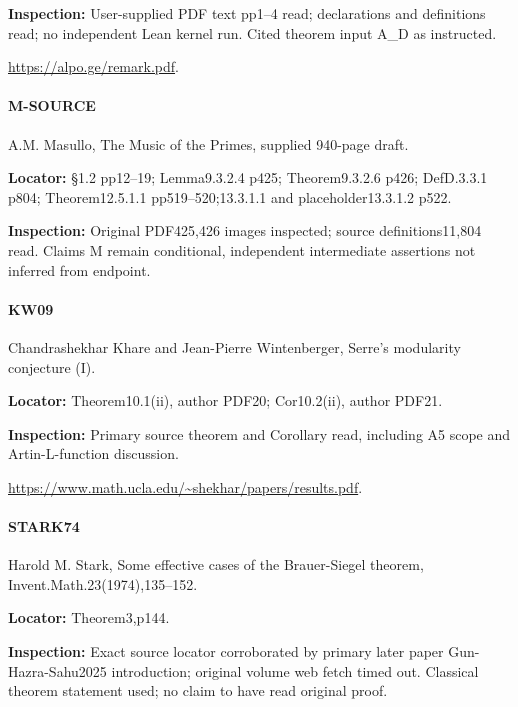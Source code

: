 \documentclass[11pt,a4paper]{article}
\begin{document}
\textbf{Inspection:} User-supplied PDF text pp1–\allowbreak{}4 read; declarations and definitions read; no independent Lean kernel run.\allowbreak{} Cited theorem input A\_\allowbreak{}D as instructed.\allowbreak{}

\url{https://alpo.ge/remark.pdf}.

\paragraph{M-SOURCE} A.\allowbreak{}M.\allowbreak{} Masullo, The Music of the Primes, supplied 940-page draft.

\textbf{Locator:} §1.\allowbreak{}2 pp12–\allowbreak{}19; Lemma9.\allowbreak{}3.\allowbreak{}2.\allowbreak{}4 p425; Theorem9.\allowbreak{}3.\allowbreak{}2.\allowbreak{}6 p426; DefD.\allowbreak{}3.\allowbreak{}3.\allowbreak{}1 p804; Theorem12.\allowbreak{}5.\allowbreak{}1.\allowbreak{}1 pp519–\allowbreak{}520;13.\allowbreak{}3.\allowbreak{}1.\allowbreak{}1 and placeholder13.\allowbreak{}3.\allowbreak{}1.\allowbreak{}2 p522.

\textbf{Inspection:} Original PDF425,426 images inspected; source definitions11,804 read.\allowbreak{} Claims M remain conditional, independent intermediate assertions not inferred from endpoint.\allowbreak{}


\paragraph{KW09} Chandrashekhar Khare and Jean-Pierre Wintenberger, Serre's modularity conjecture (I).

\textbf{Locator:} Theorem10.\allowbreak{}1(ii), author PDF20; Cor10.\allowbreak{}2(ii), author PDF21.

\textbf{Inspection:} Primary source theorem and Corollary read, including A5 scope and Artin-L-function discussion.\allowbreak{}

\url{https://www.math.ucla.edu/~shekhar/papers/results.pdf}.

\paragraph{STARK74} Harold M.\allowbreak{} Stark, Some effective cases of the Brauer-Siegel theorem, Invent.\allowbreak{}Math.\allowbreak{}23(1974),135–\allowbreak{}152.

\textbf{Locator:} Theorem3,p144.

\textbf{Inspection:} Exact source locator corroborated by primary later paper Gun-Hazra-Sahu2025 introduction; original volume web fetch timed out.\allowbreak{} Classical theorem statement used; no claim to have read original proof.\allowbreak{}
\end{document}

